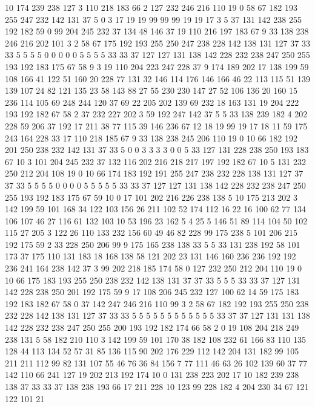 10 174 239 238 127 3 110 218 183 66 2 127 232 246 216 110 19 0 58 67
182 193 255 247 232 142 131 37 5 0 3 17 19 19 99 99 99 19 19 17
3 5 37 131 142 238 255 192 182 59 0 99 204 245 232 37 134 48 146 37
19 110 216 197 183 67 9 33 138 238 246 216 202 101 3 2 58 67 175 192
193 255 250 247 238 228 142 138 131 127 37 33 33 5 5 5 5 0 0 0
0 0 5 5 5 5 33 33 37 127 127 131 138 142 228 232 238 247 250 255
193 192 183 175 67 58 9 3 19 110 204 223 247 228 37 9 174 189 202 17
138 199 59 108 166 41 122 51 160 20 228 77 131 32 146 114 176 146 166 46
22 113 115 51 139 139 107 24 82 121 135 23 58 143 88 27 55 230 230 147
27 52 106 136 20 160 15 236 114 105 69 248 244 120 37 69 22 205 202 139
69 232 18 163 131 19 204 222 193 192 182 67 58 2 37 232 227 202 3 59
192 247 142 37 5 5 33 138 239 182 4 202 228 59 206 37 192 17 211 38
77 115 39 146 236 67 12 18 19 99 19 17 18 11 59 175 243 164 228 33
17 110 218 185 67 9 33 138 238 245 206 110 19 0 10 66 182 192 201 250
238 232 142 131 37 33 5 0 0 3 3 3 3 0 0 5 33 127 131 228
238 250 193 183 67 10 3 101 204 245 232 37 132 116 202 216 218 217 197 192
182 67 10 5 131 232 250 212 204 108 19 0 10 66 174 183 192 191 255 247
238 232 228 138 131 127 37 37 33 5 5 5 5 0 0 0 0 5 5 5
5 5 33 33 37 127 127 131 138 142 228 232 238 247 250 255 193 192 183 175
67 59 10 0 17 101 202 216 226 238 138 5 10 175 213 202 3 142 199 59
101 168 34 122 103 156 26 211 102 52 174 112 16 22 16 100 62 77 134 106
107 46 27 116 61 132 103 10 53 196 23 162 5 4 25 5 146 51 89 114
104 50 102 115 27 205 3 122 26 110 133 232 156 60 49 46 82 228 99 175
238 5 101 206 215 192 175 59 2 33 228 250 206 99 9 175 165 238 138 33
5 5 33 131 238 192 58 101 173 37 175 110 131 183 18 168 138 58 121 202
23 131 146 160 236 236 192 192 236 241 164 238 142 37 3 99 202 218 185 174
58 0 127 232 250 212 204 110 19 0 10 66 175 183 193 255 250 238 232 142
138 131 37 37 33 5 5 5 33 33 37 127 131 142 228 238 250 201 192 175
59 9 17 108 206 245 232 127 100 62 14 59 175 183 192 183 182 67 58 0
37 142 247 246 216 110 99 3 2 58 67 182 192 193 255 250 238 232 228 142
138 131 127 37 33 33 5 5 5 5 5 5 5 5 5 5 5 5 33 37
37 127 131 131 138 142 228 232 238 247 250 255 200 193 192 182 174 66 58 2
0 19 108 204 218 249 238 131 5 58 182 210 110 3 142 199 59 101 170 38
182 108 232 61 166 83 110 135 128 44 113 134 52 57 31 85 136 115 90 202
176 229 112 142 204 131 182 99 105 211 211 112 99 82 131 107 55 46 76 36
84 156 7 77 111 46 63 26 102 139 60 37 77 142 110 66 241 127 19 202
213 192 174 10 0 131 238 223 202 17 10 182 239 238 138 37 33 33 37 138
238 193 66 17 211 228 10 123 99 228 182 4 204 230 34 67 121 122 101 21
